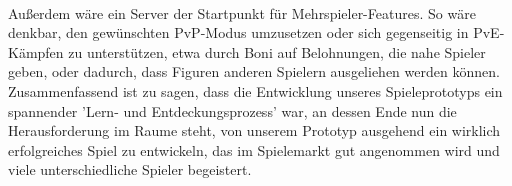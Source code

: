 \documentclass[extern,palatino]{cgBA}
\begin{document}
\\Außerdem wäre ein Server der Startpunkt für Mehrspieler-Features. So wäre denkbar, den gewünschten PvP-Modus umzusetzen oder sich gegenseitig in PvE-Kämpfen zu unterstützen, etwa durch Boni auf Belohnungen, die nahe Spieler geben, oder dadurch, dass Figuren anderen Spielern ausgeliehen werden können.
\\Zusammenfassend ist zu sagen, dass die Entwicklung unseres Spieleprototyps ein spannender 'Lern- und Entdeckungsprozess' war, an dessen Ende nun die Herausforderung im Raume steht, von unserem Prototyp ausgehend ein wirklich erfolgreiches Spiel zu entwickeln, das im Spielemarkt gut angenommen wird und viele unterschiedliche Spieler begeistert.

\newpage


\end{document}
